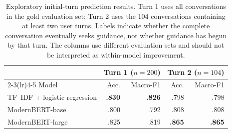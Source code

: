 \begin{table}[H]
\centering
\footnotesize
\setlength{\tabcolsep}{6pt}
\begin{tabular}{lrrrr}
\toprule
& \multicolumn{2}{c}{Turn 1 ($n=200$)} & \multicolumn{2}{c}{Turn 2 ($n=104$)} \\
\cmidrule(lr){2-3}\cmidrule(lr){4-5}
Model & Acc. & Macro-F1 & Acc. & Macro-F1 \\
\midrule
TF--IDF + logistic regression & \textbf{.830} & \textbf{.826} & .798 & .798 \\
ModernBERT-base & .800 & .792 & .808 & .808 \\
ModernBERT-large & .825 & .819 & \textbf{.865} & \textbf{.865} \\
\bottomrule
\end{tabular}
\caption{Exploratory initial-turn prediction results. Turn 1 uses all conversations in the gold evaluation set; Turn 2 uses the 104 conversations containing at least two user turns. Labels indicate whether the complete conversation eventually seeks guidance, not whether guidance has begun by that turn. The columns use different evaluation sets and should not be interpreted as within-model improvement.}
\label{tab:gold-prefix-turns}
\end{table}